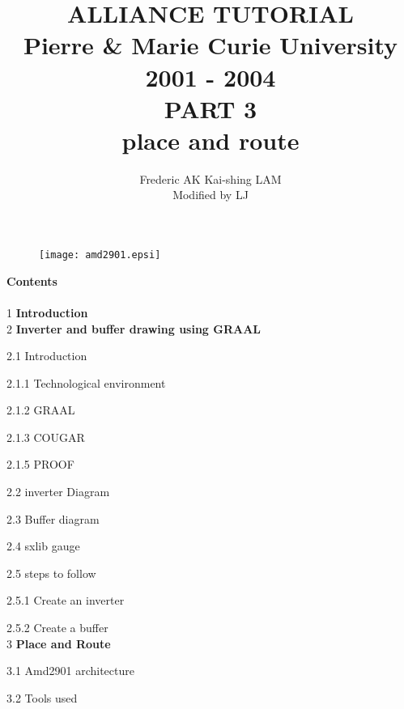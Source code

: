 \documentclass[12pt]{article}
\begin{document}
\title{
               {\Huge ALLIANCE TUTORIAL \\}
    {\large
               Pierre \& Marie Curie University \\
                          2001 - 2004\\
    }
    \vspace{1cm}
    {\huge
                      PART 3\\
    		place and route
    }
}
\date{}
\author{
Frederic AK\hspace{2cm} Kai-shing LAM\\
Modified by LJ
}

\maketitle
\begin{figure}[H]\centering
  \texttt{[image: amd2901.epsi]}
\end{figure}

\thispagestyle{empty}
\def\myfbox#1{\vspace*{3mm}\fbox{#1}\vspace{3mm}}
\newpage
{\bf Contents}\\
\\
{1} {\bf Introduction}
\\
{2 }{\bf Inverter and buffer drawing using GRAAL}

{2.1} Introduction

\hspace{0.5cm} {2.1.1} Technological environment

\hspace{0.5cm} {2.1.2} GRAAL

\hspace{0.5cm} {2.1.3} COUGAR

\hspace{0.5cm} {2.1.5} PROOF

{2.2} inverter Diagram

{2.3} Buffer diagram 

{2.4} sxlib gauge

{2.5} steps to follow

\hspace{0.5cm}  {2.5.1} Create an inverter

\hspace{0.5cm}  {2.5.2} Create a buffer
\\
{3} {\bf Place and Route}

{3.1} Amd2901 architecture

{3.2} Tools used
\end{document}
